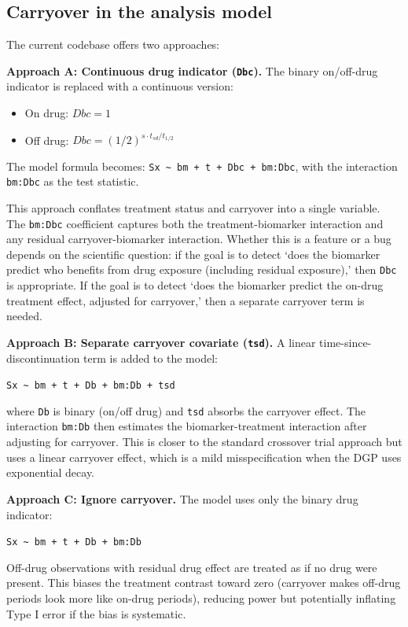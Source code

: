 \documentclass[11pt]{article}
\begin{document}
\subsection{Carryover in the analysis model}

The current codebase offers two approaches:

\textbf{Approach A: Continuous drug indicator (\texttt{Dbc}).} The binary
on/off-drug indicator is replaced with a continuous version:

\begin{itemize}
  \item On drug: $Dbc = 1$
  \item Off drug: $Dbc = (1/2)^{s \cdot t_{sd} / t_{1/2}}$
\end{itemize}

The model formula becomes:
\texttt{Sx \~{} bm + t + Dbc + bm:Dbc}, with the interaction \texttt{bm:Dbc} as
the test statistic.

This approach conflates treatment status and carryover into a
single variable. The \texttt{bm:Dbc} coefficient captures both the
treatment-biomarker interaction and any residual
carryover-biomarker interaction. Whether this is a feature or a
bug depends on the scientific question: if the goal is to detect
`does the biomarker predict who benefits from drug exposure
(including residual exposure),' then \texttt{Dbc} is appropriate. If
the goal is to detect `does the biomarker predict the on-drug
treatment effect, adjusted for carryover,' then a separate
carryover term is needed.

\textbf{Approach B: Separate carryover covariate (\texttt{tsd}).} A linear
time-since-discontinuation term is added to the model:

\texttt{Sx \~{} bm + t + Db + bm:Db + tsd}

where \texttt{Db} is binary (on/off drug) and \texttt{tsd} absorbs the
carryover effect. The interaction \texttt{bm:Db} then estimates the
biomarker-treatment interaction after adjusting for carryover.
This is closer to the standard crossover trial approach but uses
a linear carryover effect, which is a mild misspecification when
the DGP uses exponential decay.

\textbf{Approach C: Ignore carryover.} The model uses only the binary
drug indicator:

\texttt{Sx \~{} bm + t + Db + bm:Db}

Off-drug observations with residual drug effect are treated as
if no drug were present. This biases the treatment contrast
toward zero (carryover makes off-drug periods look more like
on-drug periods), reducing power but potentially inflating
Type I error if the bias is systematic.
\end{document}
